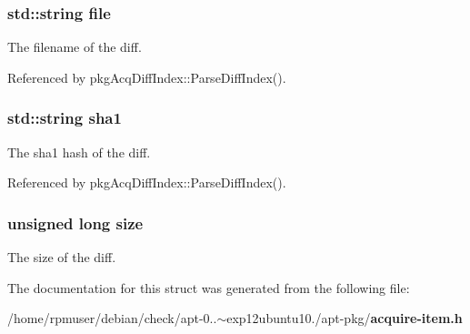 \subsubsection[{file}]{\setlength{\rightskip}{0pt plus 5cm}std\-::string {\bf file}}\label{structDiffInfo_aefc35c7944eed319c89bc1b399f0eb67}
\-The filename of the diff. 

\-Referenced by pkg\-Acq\-Diff\-Index\-::\-Parse\-Diff\-Index().

\subsubsection[{sha1}]{\setlength{\rightskip}{0pt plus 5cm}std\-::string {\bf sha1}}\label{structDiffInfo_afec3c3f7721f07dd59393b9bfff9e1dd}
\-The sha1 hash of the diff. 

\-Referenced by pkg\-Acq\-Diff\-Index\-::\-Parse\-Diff\-Index().

\subsubsection[{size}]{\setlength{\rightskip}{0pt plus 5cm}unsigned long {\bf size}}\label{structDiffInfo_a1e1268d164c38e4f8a4f4eb9058b0601}
\-The size of the diff. 

\-The documentation for this struct was generated from the following file\-:\begin{DoxyCompactItemize}
\item 
/home/rpmuser/debian/check/apt-\/0..$\sim$exp12ubuntu10./apt-\/pkg/{\bf acquire-\/item.\-h}\end{DoxyCompactItemize}
